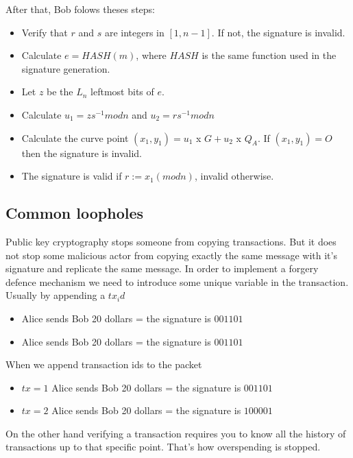 \documentclass{article}
\begin{document}
After that, Bob folows theses steps:

\begin{itemize}
  \item Verify that $r$ and $s$ are integers in $[1, n - 1]$. If not, the signature is invalid.
  \item Calculate $e = HASH(m)$, where $HASH$ is the same function used in the signature generation.
  \item Let $z$ be the $L_n$ leftmost bits of $e$.
  \item Calculate $u_1 = zs^{-1} mod n$ and $u_2 = rs^{-1} mod n$
  \item Calculate the curve point $(x_1, y_1) = u_1$ x $G + u_2$ x $Q_A$. If $(x_1, y_1) = O$ then the signature is invalid.
  \item The signature is valid if $r := x_1 (mod n)$, invalid otherwise.
  
\end{itemize}




\subsection{Common loopholes}

Public key cryptography stops someone from copying transactions. But it does not stop some malicious actor from copying exactly the same message with it's signature and replicate the same message. In order to implement a forgery defence mechanism we need to introduce some unique variable in the transaction. Usually by appending a $tx_id$


\begin{itemize}
  \item Alice sends Bob 20 dollars = the signature is $001101$
  \item Alice sends Bob 20 dollars = the signature is $001101$
\end{itemize}

When we append transaction ids to the packet

\begin{itemize}
  \item $tx=1$ Alice sends Bob 20 dollars = the signature is $001101$
  \item $tx=2$ Alice sends Bob 20 dollars = the signature is $100001$
\end{itemize}


On the other hand verifying a transaction requires you to know all the history of transactions up to that specific point. That's how overspending is stopped.
\end{document}
